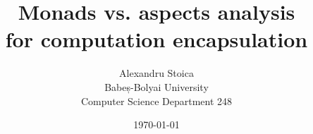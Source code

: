 
\title{\textbf{Monads vs. aspects analysis \\ for computation encapsulation }}
\date{\today} 
\author{Alexandru Stoica \\
Babeș-Bolyai University \\ 
Computer Science Department 248}

